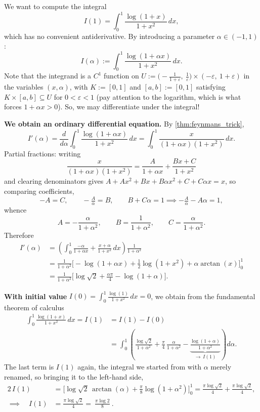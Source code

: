 \begin{example}
\label{ex:feynman_log_integral}
We want to compute the integral
\[I(1) = \int_0^1 \frac{\log(1+x)}{1+x^2}\,dx,\]
which has no convenient antiderivative. By introducing a parameter $\alpha \in (-1,1)$:
\[I(\alpha) := \int_0^1 \frac{\log(1+\alpha x)}{1+x^2}\,dx.\]
Note that the integrand is a $C^1$ function on
$U := \big(-\tfrac{1}{1+\varepsilon},\ \tfrac1\varepsilon\big) \times (-\varepsilon,\ 1+\varepsilon)$
in the variables $(x,\alpha)$, with $K := [0,1]$ and $[a,b] := [0,1]$ satisfying
$K\times[a,b] \subseteq U$ for $0 < \varepsilon < 1$ (pay attention to the logarithm, which is
what forces $1+\alpha x > 0$). So, we may differentiate under the integral!

\textbf{We obtain an ordinary differential equation.} By \cref{thm:feynmans_trick},
\[I'(\alpha) = \frac{d}{d\alpha}\int_0^1 \frac{\log(1+\alpha x)}{1+x^2}\,dx
  = \int_0^1 \frac{x}{(1+\alpha x)(1+x^2)}\,dx.\]
Partial fractions: writing
\[\frac{x}{(1+\alpha x)(1+x^2)} = \frac{A}{1+\alpha x} + \frac{Bx+C}{1+x^2}\]
and clearing denominators gives $A + Ax^2 + Bx + B\alpha x^2 + C + C\alpha x = x$, so comparing
coefficients,
\[-A = C, \qquad -\tfrac{A}{\alpha} = B, \qquad B + C\alpha = 1
  \implies -\tfrac{A}{\alpha} - A\alpha = 1,\]
whence
\[A = -\frac{\alpha}{1+\alpha^2}, \qquad B = \frac{1}{1+\alpha^2}, \qquad C = \frac{\alpha}{1+\alpha^2}.\]
Therefore
\[
\begin{aligned}
I'(\alpha) &= \left(\int_0^1 \frac{-\alpha}{1+\alpha x} + \frac{x+\alpha}{1+x^2}\,dx\right)\frac{1}{1+\alpha^2} \\
&= \frac{1}{1+\alpha^2}\Big[-\log(1+\alpha x) + \tfrac12\log(1+x^2) + \alpha\arctan(x)\Big]_0^1 \\
&= \frac{1}{1+\alpha^2}\Big[\log\sqrt2 + \tfrac{\alpha\pi}{4} - \log(1+\alpha)\Big].
\end{aligned}
\]

\textbf{With initial value} $I(0) = \int_0^1 \frac{\log(1)}{1+x^2}\,dx = 0$, we obtain from the
fundamental theorem of calculus
\[
\begin{aligned}
\int_0^1 \frac{\log(1+x)}{1+x^2}\,dx = I(1) &= I(1)-I(0) \\
&= \int_0^1\left(\frac{\log\sqrt2}{1+\alpha^2} + \frac{\pi}{4}\,\frac{\alpha}{1+\alpha^2}
   - \underbrace{\frac{\log(1+\alpha)}{1+\alpha^2}}_{\textstyle \to\, I(1)}\right)d\alpha.
\end{aligned}
\]
The last term is $I(1)$ again, the integral we started from with $\alpha$ merely renamed, so
bringing it to the left-hand side,
\[
\begin{aligned}
2\,I(1) &= \Big[\log\sqrt2\,\arctan(\alpha) + \tfrac{\pi}{8}\log(1+\alpha^2)\Big]_0^1
 = \frac{\pi\log\sqrt2}{4} + \frac{\pi\log\sqrt2}{4}, \\[1ex]
\implies\quad I(1) &= \frac{\pi\log\sqrt2}{4} = \boxed{\ \frac{\pi\log 2}{8}\ }.
\end{aligned}
\]
\end{example}

